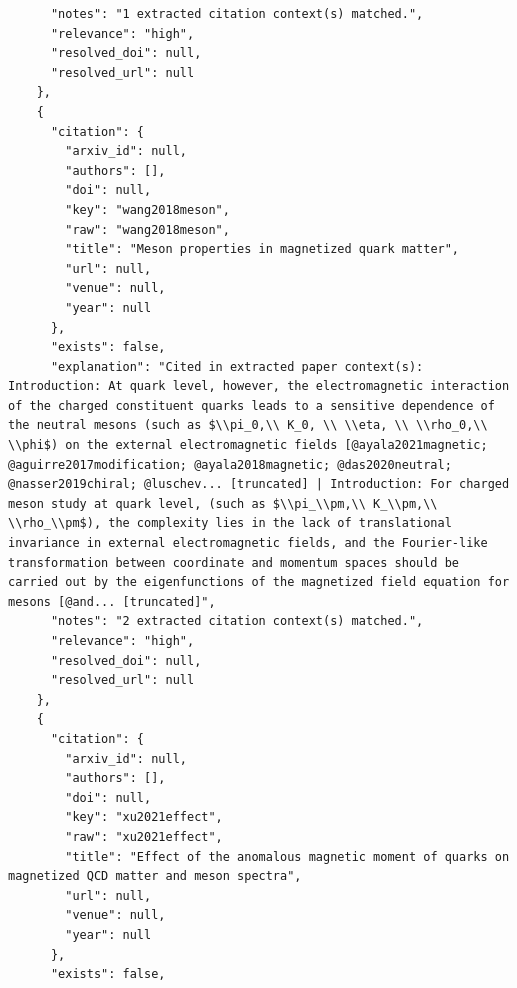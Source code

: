 \documentclass[11pt]{article}
\begin{document}
\begin{verbatim}
      "notes": "1 extracted citation context(s) matched.",
      "relevance": "high",
      "resolved_doi": null,
      "resolved_url": null
    },
    {
      "citation": {
        "arxiv_id": null,
        "authors": [],
        "doi": null,
        "key": "wang2018meson",
        "raw": "wang2018meson",
        "title": "Meson properties in magnetized quark matter",
        "url": null,
        "venue": null,
        "year": null
      },
      "exists": false,
      "explanation": "Cited in extracted paper context(s): Introduction: At quark level, however, the electromagnetic interaction of the charged constituent quarks leads to a sensitive dependence of the neutral mesons (such as $\\pi_0,\\ K_0, \\ \\eta, \\ \\rho_0,\\ \\phi$) on the external electromagnetic fields [@ayala2021magnetic; @aguirre2017modification; @ayala2018magnetic; @das2020neutral; @nasser2019chiral; @luschev... [truncated] | Introduction: For charged meson study at quark level, (such as $\\pi_\\pm,\\ K_\\pm,\\ \\rho_\\pm$), the complexity lies in the lack of translational invariance in external electromagnetic fields, and the Fourier-like transformation between coordinate and momentum spaces should be carried out by the eigenfunctions of the magnetized field equation for mesons [@and... [truncated]",
      "notes": "2 extracted citation context(s) matched.",
      "relevance": "high",
      "resolved_doi": null,
      "resolved_url": null
    },
    {
      "citation": {
        "arxiv_id": null,
        "authors": [],
        "doi": null,
        "key": "xu2021effect",
        "raw": "xu2021effect",
        "title": "Effect of the anomalous magnetic moment of quarks on magnetized QCD matter and meson spectra",
        "url": null,
        "venue": null,
        "year": null
      },
      "exists": false,

\end{verbatim}
\end{document}
